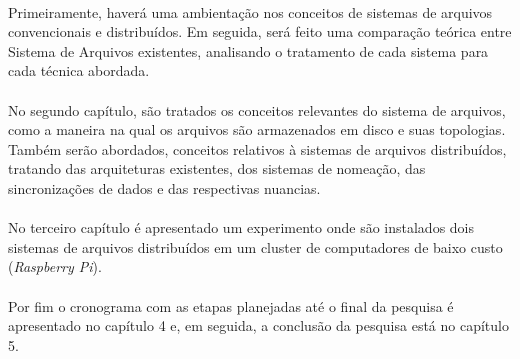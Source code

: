 \paragraph{}Primeiramente, haverá uma ambientação nos conceitos de sistemas de arquivos convencionais e distribuídos. Em seguida, será feito uma comparação teórica entre Sistema de Arquivos existentes, analisando o tratamento de cada sistema para cada técnica abordada.

\paragraph{}No segundo capítulo, são tratados os conceitos relevantes do sistema de arquivos, como a maneira na qual os arquivos são armazenados em disco e suas topologias. Também serão abordados, conceitos relativos à sistemas de arquivos distribuídos, tratando das arquiteturas existentes, dos sistemas de nomeação, das sincronizações de dados e das respectivas nuancias.

\paragraph{}No terceiro capítulo é apresentado um experimento onde são instalados dois sistemas de arquivos distribuídos em um cluster de computadores de baixo custo (\textit{Raspberry Pi}).

\paragraph{}Por fim o cronograma com as etapas planejadas até o final da pesquisa é apresentado no capítulo 4 e, em seguida, a conclusão da pesquisa está no capítulo 5.
